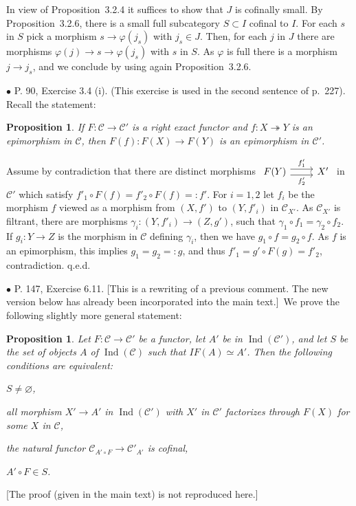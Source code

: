 \documentclass[12pt]{article}
\newtheorem{prop}[thm]{Proposition}
\theoremstyle{remark}
\newcommand{\bu}{\bullet}
\newcommand{\n}{\noindent}
\newcommand{\cc}{\mathcal}
\newcommand{\C}{\mathcal C}
\newcommand{\epi}{\twoheadrightarrow}
\newcommand{\p}{\varphi}
\newcommand{\pr}{Proposition}
\newcommand{\rw}{[This is a rewriting of a previous comment. The new version below has already been incorporated into the main text.]}
\DeclareMathOperator{\Ind}{Ind}
\begin{document}
\n{\em Proof.} In view of \pr\ 3.2.4 it suffices to show that $J$ is cofinally small. By \pr\ 3.2.6, there is a small full subcategory $S\subset I$ cofinal to $I$. For each $s$ in $S$ pick a morphism $s\to\p(j_s)$ with $j_s\in J$. Then, for each $j$ in $J$ there are morphisms $\p(j)\to s\to\p(j_s)$ with $s$ in $S$. As $\p$ is full there is a morphism $j\to j_s$, and we conclude by using again \pr\ 3.2.6. 


\n$\bu$ P. 90, Exercise 3.4 (i). (This exercise is used in the second sentence of p.~227). Recall the statement: 
%
\begin{prop}\label{34i}
If $F:\C\to\C'$ is a right exact functor and $f:X\epi Y$ is an epimorphism in $\C$, then $F(f):F(X)\to F(Y)$ is an epimorphism in $\C'$.
\end{prop}
%
\n{\em Proof.} Assume by contradiction that there are distinct morphisms $\begin{tikzcd}F(Y)\ar[yshift=.7ex]{r}{f'_1}\ar[yshift=-.7ex]{r}[swap]{f'_2}&X'\end{tikzcd}$ in $\C'$ which satisfy 
$
f'_1\circ F(f)=f'_2\circ F(f)=:f'.
$ 
For $i=1,2$ let $f_i$ be the morphism $f$ viewed as a morphism from $(X,f')$ to $(Y,f'_i)$ in $\C_{X'}$. As $\C_{X'}$ is filtrant, there are morphisms $\gamma_i:(Y,f'_i)\to(Z,g')$, such that $\gamma_1\circ f_1=\gamma_2\circ f_2$. If $g_i:Y\to Z$ is the morphism in $\C$ defining $\gamma_i$, then we have $g_1\circ f=g_2\circ f$. As $f$ is an epimorphism, this implies $g_1=g_2=:g$, and thus $f'_1=g'\circ F(g)=f'_2$, contradiction. q.e.d.


\n$\bu$ P. 147, Exercise 6.11. \rw\ We prove the following slightly more general statement: 
% 
\begin{prop}
%
Let $F:\cc C\to\cc C'$ be a functor, let $A'$ be in $\Ind(\cc C')$, and let $S$ be the set of objects $A$ of $\Ind(\cc C)$ such that $IF(A)\simeq A'$. Then the following conditions are equivalent: 

\n{\em(a)} $S\neq\varnothing$, 

\n{\em(b)} all morphism $X'\to A'$ in $\Ind(\cc C')$ with $X'$ in $\cc C'$ factorizes through $F(X)$ for some $X$ in $\cc C$, 

\n{\em(c)} the natural functor $\cc C_{A'\circ F}\to\cc C'_{A'}$ is cofinal, 

\n{\em(d)} $A'\circ F\in S$.
%
\end{prop}
%
[The proof (given in the main text) is not reproduced here.]\bigskip 
\end{document}
